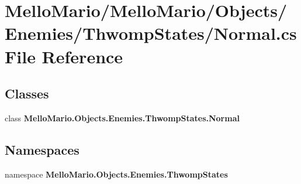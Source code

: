 \section{Mello\+Mario/\+Mello\+Mario/\+Objects/\+Enemies/\+Thwomp\+States/\+Normal.cs File Reference}
\label{Enemies_2ThwompStates_2Normal_8cs}
\subsection*{Classes}
\begin{DoxyCompactItemize}
\item 
class \textbf{ Mello\+Mario.\+Objects.\+Enemies.\+Thwomp\+States.\+Normal}
\end{DoxyCompactItemize}
\subsection*{Namespaces}
\begin{DoxyCompactItemize}
\item 
namespace \textbf{ Mello\+Mario.\+Objects.\+Enemies.\+Thwomp\+States}
\end{DoxyCompactItemize}
